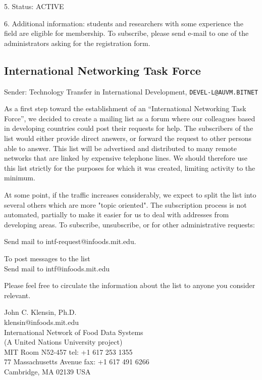 5. Status: ACTIVE

6. Additional information: students and researchers with some experience
the field are eligible for membership. To subscribe, please send e-mail
to one of the administrators asking for the registration form.

\subsection{International Networking Task Force}

Sender: Technology Transfer in International Development, 
\verb+DEVEL-L@AUVM.BITNET+
 
     As a first step toward the establishment of an
``International Networking Task Force'', we decided to create a
mailing list as a forum where our colleagues based in developing
countries could post their requests for help. The subscribers of
the list would either provide direct answers, or forward the
request to other persons able to answer.
     This list will be advertised and distributed to many remote
networks that are linked by expensive telephone lines. We should
therefore use this list strictly for the purposes for which it
was created, limiting activity to the minimum.
 
      At some point, if the traffic increases considerably, we
expect to split the list into several others which are more
"topic oriented". The subscription
process is not automated, partially to make it easier for us to
deal with addresses from developing areas.
 To subscribe, unsubscribe, or for other administrative requests:

   Send mail to intf-request@infoods.mit.edu.  

To post messages to the list\\
   Send mail to intf@infoods.mit.edu
 
Please feel free to circulate the information about the list to
anyone you consider relevant.
 
John C. Klensin, Ph.D.\\
klensin@infoods.mit.edu\\
International Network of Food Data Systems\\
  (A United Nations University project)\\
MIT Room N52-457                       tel: +1 617 253 1355\\
77 Massachusetts Avenue                fax: +1 617 491 6266\\
Cambridge, MA 02139 USA
 
